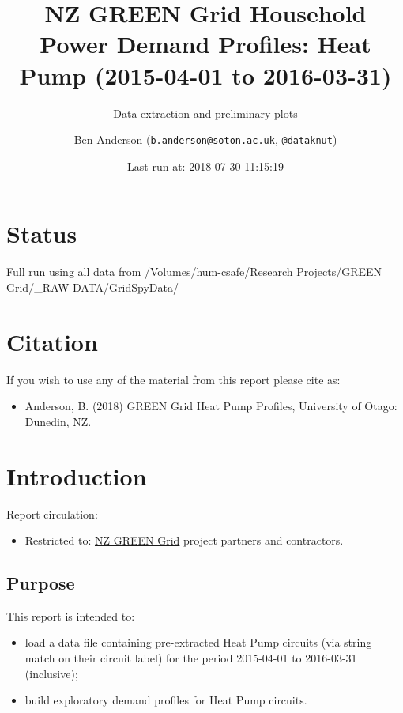 \documentclass[]{article}
\title{NZ GREEN Grid Household Power Demand Profiles: Heat Pump (2015-04-01 to
2016-03-31)}
\subtitle{Data extraction and preliminary plots}
\author{Ben Anderson
(\href{mailto:b.anderson@soton.ac.uk}{\nolinkurl{b.anderson@soton.ac.uk}},
\texttt{@dataknut})}
\date{Last run at: 2018-07-30 11:15:19}
\providecommand{\tightlist}{%
  \setlength{\itemsep}{0pt}\setlength{\parskip}{0pt}}
\begin{document}
\maketitle

{
\setcounter{tocdepth}{2}
\tableofcontents
}
\newpage

\section{Status}\label{status}

Full run using all data from /Volumes/hum-csafe/Research Projects/GREEN
Grid/\_RAW DATA/GridSpyData/

\section{Citation}\label{citation}

If you wish to use any of the material from this report please cite as:

\begin{itemize}
\tightlist
\item
  Anderson, B. (2018) GREEN Grid Heat Pump Profiles, University of
  Otago: Dunedin, NZ.
\end{itemize}

\newpage

\section{Introduction}\label{introduction}

Report circulation:

\begin{itemize}
\tightlist
\item
  Restricted to:
  \href{https://www.otago.ac.nz/centre-sustainability/research/energy/otago050285.html}{NZ
  GREEN Grid} project partners and contractors.
\end{itemize}

\subsection{Purpose}\label{purpose}

This report is intended to:

\begin{itemize}
\tightlist
\item
  load a data file containing pre-extracted Heat Pump circuits (via
  string match on their circuit label) for the period 2015-04-01 to
  2016-03-31 (inclusive);
\item
  build exploratory demand profiles for Heat Pump circuits.
\end{itemize}
\end{document}
